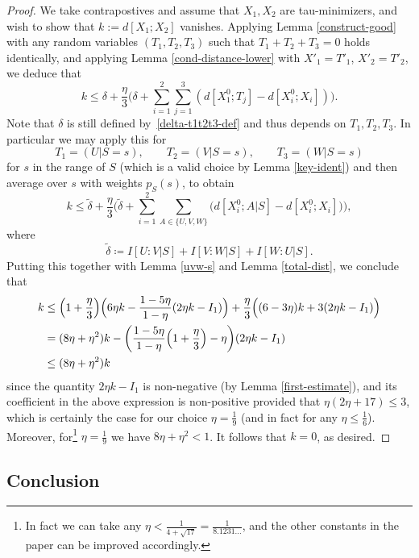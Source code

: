 \begin{proof}
  We take contrapostives and assume that $X_1,X_2$ are tau-minimizers, and wish to show that $k := d[X_1;X_2]$ vanishes.  Applying Lemma \ref{construct-good} with any random variables $(T_1,T_2,T_3)$ such that $T_1+T_2+T_3=0$ holds identically, and applying Lemma \ref{cond-distance-lower} with $X'_1 = T'_1$, $X'_2 = T'_2$, we deduce that
\[
  k \leq \delta + \frac{\eta}{3} \biggl( \delta + \sum_{i=1}^2 \sum_{j = 1}^3 (d[X^0_1;T_j] - d[X^0_i;X_i]) \biggr).
\]
Note that $\delta$ is still defined by~\eqref{delta-t1t2t3-def} and thus depends on $T_1,T_2,T_3$.
In particular we may apply this for
\[
  T_1 = (U | S = s),\qquad T_2 = (V | S = s), \qquad T_3 = (W | S = s)
\]
for $s$ in the range of $S$ (which is a valid choice by Lemma \ref{key-ident}) and then average over $s$ with weights $p_S(s)$, to obtain
\[ k \leq \tilde \delta + \frac{\eta}{3} \biggl( \tilde \delta + \sum_{i=1}^2 \sum_{A\in\{U,V,W\}} \bigl(  d[X^0_i;A|S] - d[X^0_i;X_i]\bigr) \biggr),\]
where
\[
  \tilde \delta \coloneqq  I[U : V | S] + I[V : W | S] + I[W : U | S].
\]
Putting this together with Lemma \ref{uvw-s} and Lemma \ref{total-dist}, we conclude that
\begin{align*}
  k &\leq \Bigl(1+\frac{\eta}{3}\Bigr)\Bigl(6\eta k-\frac{1-5\eta}{1-\eta}(2\eta k-I_1)\Bigr)+\frac{\eta}{3}\Bigl((6-3\eta)k+3(2\eta k-I_1)\Bigr)\\
  &= (8\eta + \eta^2) k - \biggl( \frac{1 - 5 \eta}{1-\eta}\Bigl(1 + \frac{\eta}{3}\Bigr) -  \eta \biggr)(2 \eta k - I_1)\\
  &\leq (8 \eta + \eta^2) k
 \end{align*}
since the quantity $2 \eta k - I_1$ is non-negative (by Lemma \ref{first-estimate}), and its coefficient in the above expression is non-positive provided that $\eta(2\eta + 17) \le 3$, which is certainly the case for our choice $\eta = \frac{1}{9}$ (and in fact for any $\eta \leq \frac{1}{6}$).
Moreover, for\footnote{In fact we can take any $\eta<\frac{1}{4 + \sqrt{17}} = \frac{1}{8.1231\dots}$, and the other constants in the paper can be improved accordingly.} $\eta=\tfrac{1}{9}$ we have $8 \eta + \eta^2 < 1$. It follows that $k=0$, as desired.
\end{proof}


\subsection{Conclusion}

